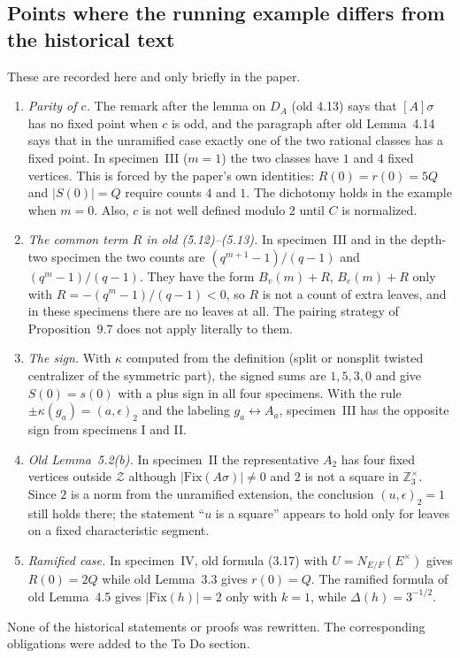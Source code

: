 \documentclass[12pt,letterpaper]{amsart}
\begin{document}
\subsection*{Points where the running example differs from the historical text}
These are recorded here and only briefly in the paper.
\begin{enumerate}
\item \emph{Parity of $c$.} The remark after the lemma on $D_A$ (old
4.13) says that $[A]\sigma$ has no fixed point when $c$ is odd, and
the paragraph after old Lemma~4.14 says that in the unramified case
exactly one of the two rational classes has a fixed point. In
specimen~III ($m=1$) the two classes have $1$ and $4$ fixed vertices.
This is forced by the paper's own identities: $R(0)=r(0)=5Q$ and
$|S(0)|=Q$ require counts $4$ and $1$. The dichotomy holds in the
example when $m=0$. Also, $c$ is not well defined modulo $2$ until $C$
is normalized.
\item \emph{The common term $R$ in old (5.12)--(5.13).} In
specimen~III and in the depth-two specimen the two counts are
$(q^{m+1}-1)/(q-1)$ and $(q^m-1)/(q-1)$. They have the form
$B_v(m)+R$, $B_e(m)+R$ only with $R=-(q^m-1)/(q-1)<0$, so $R$ is not a
count of extra leaves, and in these specimens there are no leaves at
all. The pairing strategy of Proposition~9.7 does not apply literally
to them.
\item \emph{The sign.} With $\kappa$ computed from the definition
(split or nonsplit twisted centralizer of the symmetric part), the
signed sums are $1,5,3,0$ and give $S(0)=s(0)$ with a plus sign in all
four specimens. With the rule $\pm\kappa(g_a)=(a,\epsilon)_2$ and the
labeling $g_a\leftrightarrow A_a$, specimen~III has the opposite sign
from specimens I and II.
\item \emph{Old Lemma~5.2(b).} In specimen~II the representative $A_2$
has four fixed vertices outside $\mathcal Z$ although
$|\mathrm{Fix}(A\sigma)|\neq0$ and $2$ is not a square in
$\mathbb Z_3^\times$. Since $2$ is a norm from the unramified
extension, the conclusion $(u,\epsilon)_2=1$ still holds there; the
statement ``$u$ is a square'' appears to hold only for leaves on a
fixed characteristic segment.
\item \emph{Ramified case.} In specimen~IV, old formula (3.17) with
$U=N_{E/F}(E^\times)$ gives $R(0)=2Q$ while old Lemma~3.3 gives
$r(0)=Q$. The ramified formula of old Lemma~4.5 gives
$|\mathrm{Fix}(h)|=2$ only with $k=1$, while $\Delta(h)=3^{-1/2}$.
\end{enumerate}
None of the historical statements or proofs was rewritten. The
corresponding obligations were added to the To Do section.
\end{document}
